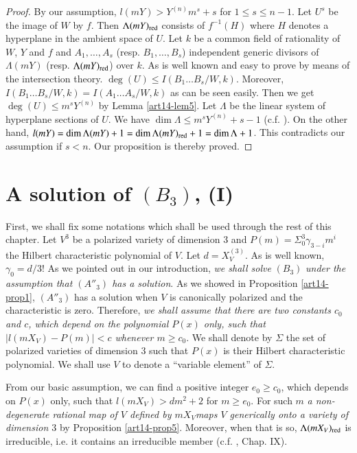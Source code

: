 \begin{proof}
By our assumption, $l(mY)>Y^{(n)}m^{s}+s$ for $1\leq s\leq n-1$. Let $U^{s}$ be the image of $W$ by $f$. Then $\Lambda(mY)_{\operatorname{\mathrm{red}}}$ consists of $f^{-1}(H)$ where $H$ denotes a hyperplane in the ambient space of $U$. Let $k$ be a common field of rationality of $W$, $Y$ and $f$ and $A_{1},\ldots,A_{s}$ (resp. $B_{1},\ldots,B_{s}$) independent generic divisors of $\Lambda(mY)$ (resp. $\Lambda(mY)_{\operatorname{\mathrm{red}}}$) over $k$. As is well known and easy to prove by means of the intersection theory. $\deg(U)\leq I(B_{1}\ldots B_{s}/W,k)$. Moreover, $I(B_{1}\ldots B_{s}/W,k)=I(A_{1}\ldots A_{s}/W,k)$ as can be seen easily. Then we get $\deg (U)\leq m^{s}Y^{(n)}$ by Lemma \ref{art14-lem5}. Let $\Lambda$ be the linear system of hyperplane sections of $U$. We have $\dim \Lambda \leq m^{s}Y^{(n)}+s-1$ (c.f. \cite{art14-key17}). On the other hand, $l(mY)=\dim \Lambda (mY)+1=\dim \Lambda(mY)_{\operatorname{\mathrm{red}}}+1=\dim \Lambda +1$. This contradicts our assumption if $s<n$. Our proposition is thereby proved.
\end{proof}

\section{A solution of $(B_{3})$, (I)}\label{art14-sec5}

First, we shall fix some notations which shall be used through the rest of this chapter. Let $V^{3}$ be a polarized variety of dimension 3 and $P(m)=\Sigma^{3}_{0}\gamma_{3-i}m^{i}$ the Hilbert characteristic polynomial of $V$. Let $d=X^{(3)}_{V}$. As is well known, $\gamma_{0}=d/3$! As we pointed out in our introduction, {\em we shall solve} $(B_{3})$ {\em under the assumption that $(A''_{3})$ has a solution}. As we showed in Proposition \ref{art14-prop1}, $(A''_{3})$ has a solution when $V$ is canonically polarized and the characteristic is zero. Therefore, {\em we shall assume that there are two constants $c_{0}$ and $c$, which depend on the polynomial $P(x)$ only, such that $|l(mX_{V})-P(m)|<c$ whenever $m\geq c_{0}$}. We shall denote by $\Sigma$ the set of polarized varieties of dimension 3 such that $P(x)$ is their Hilbert characteristic polynomial. We shall use $V$ to denote a ``variable element'' of $\Sigma$.

From our basic assumption, we can find a positive integer $e_{0}\geq c_{0}$, which depends on $P(x)$ only, such that $l(mX_{V})>dm^{2}+2$ for $m\geq e_{0}$. For such $m$ {\em a non-degenerate rational map of $V$ defined by $mX_{V}$\pageoriginale maps $V$ generically onto a variety of dimension $3$} by Proposition \ref{art14-prop5}. Moreover, when that is so, $\Lambda(mX_{V})_{\operatorname{\mathrm{red}}}$ is irreducible, i.e. it contains an irreducible member (c.f. \cite{art14-key25}, Chap. IX).

